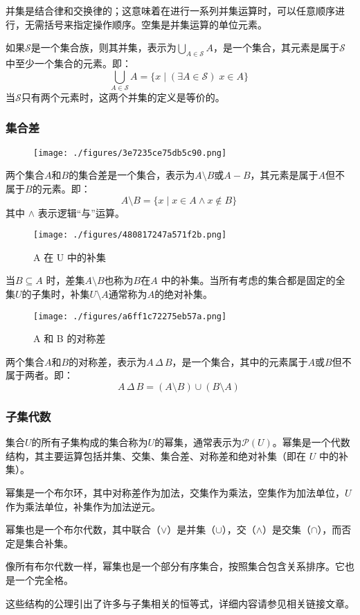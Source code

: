 并集是结合律和交换律的；这意味着在进行一系列并集运算时，可以任意顺序进行，无需括号来指定操作顺序。空集是并集运算的单位元素。

如果\( \mathcal{S} \)是一个集合族，则其并集，表示为\( \bigcup_{A \in \mathcal{S}} A \)，是一个集合，其元素是属于\( \mathcal{S} \)中至少一个集合的元素。即：
\[
\bigcup_{A \in \mathcal{S}} A = \{x \mid (\exists A \in \mathcal{S})\; x \in A\}~
\]
当\( \mathcal{S} \)只有两个元素时，这两个并集的定义是等价的。
\subsubsection{集合差}
\begin{figure}[ht]
\centering
\texttt{[image: ./figures/3e7235ce75db5c90.png]}
\caption{} \label{fig_JHSX_6}
\end{figure}
两个集合\( A \)和\( B \)的集合差是一个集合，表示为\( A \setminus B \)或\( A - B \)，其元素是属于\( A \)但不属于\( B \)的元素。即：
\[
A \setminus B = \{x \mid x \in A \land x \notin B\}~
\]
其中 \( \land \) 表示逻辑“与”运算。
\begin{figure}[ht]
\centering
\texttt{[image: ./figures/480817247a571f2b.png]}
\caption{A 在 U 中的补集} \label{fig_JHSX_7}
\end{figure}
当\( B \subseteq A \) 时，差集\( A \setminus B \)也称为\( B \)在\( A \) 中的补集。当所有考虑的集合都是固定的全集\( U \)的子集时，补集\( U \setminus A \)通常称为\( A \)的绝对补集。
\begin{figure}[ht]
\centering
\texttt{[image: ./figures/a6ff1c72275eb57a.png]}
\caption{A 和 B 的对称差} \label{fig_JHSX_8}
\end{figure}
两个集合\( A \)和\( B \)的对称差，表示为\( A \, \Delta \, B \)，是一个集合，其中的元素属于\( A \)或\( B \)但不属于两者。即：
\[
A \, \Delta \, B = (A \setminus B) \cup (B \setminus A)~
\]
\subsubsection{子集代数}
集合\( U \)的所有子集构成的集合称为\( U \)的幂集，通常表示为\( \mathcal{P}(U) \)。幂集是一个代数结构，其主要运算包括并集、交集、集合差、对称差和绝对补集（即在 \( U \) 中的补集）。

幂集是一个布尔环，其中对称差作为加法，交集作为乘法，空集作为加法单位，\( U \) 作为乘法单位，补集作为加法逆元。

幂集也是一个布尔代数，其中联合（\( \lor \)）是并集（\( \cup \)），交（\( \land \)）是交集（\( \cap \)），而否定是集合补集。

像所有布尔代数一样，幂集也是一个部分有序集合，按照集合包含关系排序。它也是一个完全格。

这些结构的公理引出了许多与子集相关的恒等式，详细内容请参见相关链接文章。